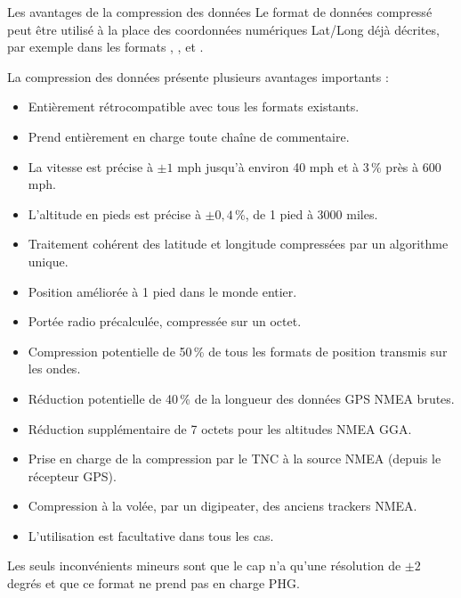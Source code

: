\begin{aprssideblock}{Les avantages de la compression des données}
Le format de données compressé peut être utilisé à la place des coordonnées
numériques Lat/Long déjà décrites, par exemple dans les formats \lit{!},
\lit{/},  et \lit{=}.

La compression des données présente plusieurs avantages importants :

\begin{itemize}
\setlength{\itemsep}{0.25em}
\setlength{\parskip}{0pt}
\item Entièrement rétrocompatible avec tous les formats existants.
\item Prend entièrement en charge toute chaîne de commentaire.
\item La vitesse est précise à $\pm 1$ mph jusqu'à environ 40 mph et à 3\,\%
  près à 600 mph.
\item L'altitude en pieds est précise à $\pm 0{,}4$\,\%, de 1 pied à
  3000 miles.
\item Traitement cohérent des latitude et longitude compressées par un
  algorithme unique.
\item Position améliorée à 1 pied dans le monde entier.
\item Portée radio précalculée, compressée sur un octet.
\item Compression potentielle de 50\,\% de tous les formats de position
  transmis sur les ondes.
\item Réduction potentielle de 40\,\% de la longueur des données GPS NMEA
  brutes.
\item Réduction supplémentaire de 7 octets pour les altitudes NMEA GGA.
\item Prise en charge de la compression par le TNC à la source NMEA
  (depuis le récepteur GPS).
\item Compression à la volée, par un digipeater, des anciens trackers NMEA.
\item L'utilisation est facultative dans tous les cas.
\end{itemize}

Les seuls inconvénients mineurs sont que le cap n'a qu'une résolution de
$\pm 2$ degrés et que ce format ne prend pas en charge PHG.
\end{aprssideblock}

